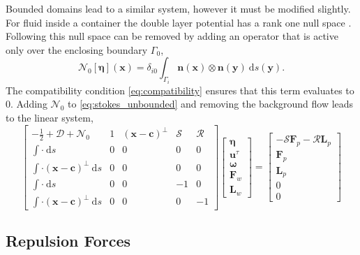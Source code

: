 \documentclass[preprint, 10pt]{elsarticle}
\begin{document}
Bounded domains lead to a similar system, however it must be modified slightly. For fluid inside a container the double layer potential has a rank one null space \cite{Ladyzhenskaya1963}. Following \cite{Power1993} this null space can be removed by adding an operator that is active only over the enclosing boundary $\Gamma_0$,
\[ \mathcal{N}_0[\pmb{\eta}](\mathbf{x}) = \delta_{i0} \int_{\Gamma_i}\mathbf{n}(\mathbf{x})\otimes\mathbf{n}(\mathbf{y})~\text{d}s(\mathbf{y}).\]
The compatibility condition \eqref{eq:compatibility} ensures that this term evaluates to 0. Adding $\mathcal{N}_0$ to \eqref{eq:stokes_unbounded} and removing the background flow leads to the linear system,
\begin{equation}\label{eq:stokes_bounded} \begin{bmatrix} -\frac{1}{2} + \mathcal{D} + \mathcal{N}_0 & 1 & (\mathbf{x}-\mathbf{c})^\perp & \mathcal{S} & \mathcal{R}\\
		\int \cdot~ \text{d}s & 0 & 0 & 0 & 0\\
		\int\cdot(\mathbf{x}-\mathbf{c})^\perp~\text{d}s & 0 & 0 & 0 & 0\\
		\int \cdot~ \text{d}s & 0 & 0 & - 1 & 0\\
		\int\cdot(\mathbf{x}-\mathbf{c})^\perp~\text{d}s & 0 & 0 & 0 & -1\end{bmatrix}
\begin{bmatrix}
	\pmb{\eta}\\\mathbf{u}^\tau \\ \pmb{\omega} \\ \mathbf{F}_w \\\mathbf{ L}_w
\end{bmatrix}
=
\begin{bmatrix}
	 - \mathcal{S}\mathbf{F}_p - \mathcal{R}\mathbf{L}_p\\
	\mathbf{F}_p\\
	\mathbf{L}_p\\
	0\\
	0
\end{bmatrix}
\end{equation}



\subsection{Repulsion Forces}
\end{document}
